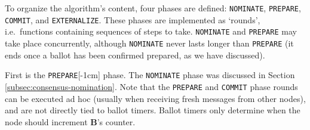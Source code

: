To organize the algorithm's content, four phases are defined: {\tt NOMINATE}, {\tt PREPARE}, {\tt COMMIT}, and {\tt EXTERNALIZE}. These phases are implemented as `rounds', i.e.\ functions containing sequences of steps to take. {\tt NOMINATE} and {\tt PREPARE} may take place concurrently, although {\tt NOMINATE} never lasts longer than {\tt PREPARE} (it ends once a ballot has been confirmed prepared, as we have discussed).

First is the {\tt PREPARE}[-1cm] phase. The {\tt NOMINATE} phase was discussed in Section \ref{subsec:consensus-nomination}. Note that the {\tt PREPARE} and {\tt COMMIT} phase rounds can be executed ad hoc (usually when receiving fresh messages from other nodes), and are not directly tied to ballot timers. Ballot timers only determine when the node should increment \textbf{B}'s counter.

